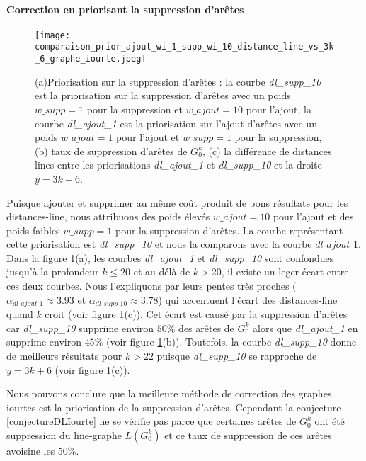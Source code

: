 \documentclass[onecolumn, 12pt]{book}
\begin{document}
\paragraph{Correction en priorisant la suppression d'ar\^etes } %
\begin{figure}[htb!] 
\centering
\texttt{[image: comparaison\_prior\_ajout\_wi\_1\_supp\_wi\_10\_distance\_line\_vs\_3k\_6\_graphe\_iourte.jpeg]}
\caption{(a)Priorisation sur la suppression d'ar\^etes : la courbe {\em dl\_supp\_10} est la priorisation sur la suppression d'ar\^etes avec un poids $w\_supp=1$ pour la suppression et $w\_ajout = 10$ pour l'ajout,   la courbe {\em dl\_ajout\_1} est la priorisation sur l'ajout d'ar\^etes avec un poids $w\_ajout=1$ pour l'ajout et $w\_supp = 1$ pour la suppression, (b) taux de suppression d'ar\^etes de $G_0^k$, (c) la diff\'erence de distances lines entre les priorisations {\em dl\_ajout\_1} et  {\em dl\_supp\_10}  et la droite $y=3k+6$. }
\label{priorAjout1Supp10} 
\end{figure}
Puisque ajouter et supprimer au m\^eme co\^ut produit de bons r\'esultats pour les distances-line,  nous attribuons des poids \'elev\'es  $w\_ajout = 10$ pour l'ajout et des poids faibles $w\_supp = 1$ pour la suppression d'ar\^etes. La courbe repr\'esentant cette priorisation est  {\em dl\_supp\_10} et nous la comparons avec la courbe $dl\_ajout\_1$.
\newline
Dans la figure  \ref{priorAjout1Supp10}(a), les courbes {\em dl\_ajout\_1} et {\em dl\_supp\_10} sont confondues jusqu'\`a la profondeur $k \le 20$ et au d\'el\`a de $k > 20$, il existe un leger \'ecart entre ces deux courbes. Nous l'expliquons par leurs pentes tr\`es proches ($\alpha_{dl\_ajout\_1} \approx 3.93$ et $\alpha_{dl\_supp\_10} \approx 3.78$) qui accentuent l'\'ecart des distances-line quand $k$ croit (voir figure \ref{priorAjout1Supp10}(c)). 
Cet \'ecart est caus\'e par la suppression d'ar\^etes car {\em dl\_supp\_10} supprime environ $50\%$ des ar\^etes de $G_0^k$ alors que  {\em dl\_ajout\_1} en supprime environ $45\%$ (voir figure \ref{priorAjout1Supp10}(b)).
Toutefois, la courbe {\em dl\_supp\_10} donne de meilleurs r\'esultats pour $k > 22$ puisque {\em dl\_supp\_10} se rapproche de $y=3k+6$ (voir figure \ref{priorAjout1Supp10}(c)).


Nous pouvons conclure que la meilleure m\'ethode de correction des graphes iourtes est la priorisation de la suppression d'ar\^etes.
Cependant la conjecture \ref{conjectureDLIourte} ne se v\'erifie pas parce que certaines ar\^etes de $G_0^k$ ont \'et\'e suppression du line-graphe $L(G_0^k)$ et ce taux de suppression de ces ar\^etes  avoisine les $50\%$.
\end{document}
